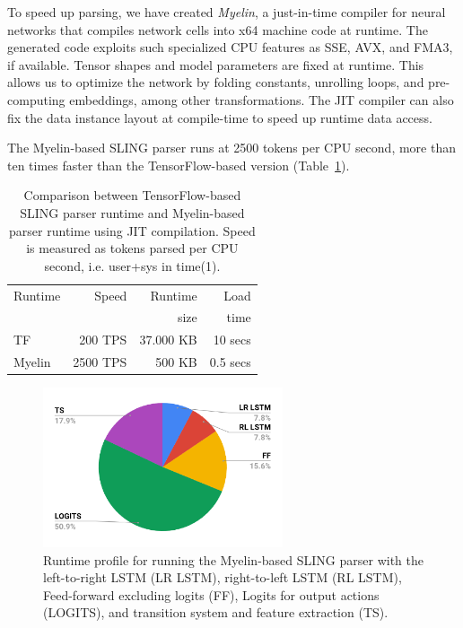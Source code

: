 \documentclass[11pt,a4paper]{article}
\begin{document}
To speed up parsing, we have created \emph{Myelin}, a
just-in-time compiler for neural networks that compiles network cells into
x64 machine code at runtime. The generated code exploits such
specialized CPU features as SSE, AVX, and FMA3, if available.
Tensor shapes and model parameters are fixed at runtime.
This allows us to optimize the network by folding constants, unrolling
loops, and pre-computing embeddings, among other transformations. The JIT compiler can also fix the data
instance layout at compile-time to speed up runtime data access.

The Myelin-based SLING parser runs at 2500 tokens per CPU second, more
than ten times faster than the TensorFlow-based version
(Table~\ref{tab:runtime}).

\begin{table}[!t]
\centering
\begin{tabular}{|l|r|r|r|}
\hline
Runtime    & Speed     & Runtime      & Load      \\
           &           & size         & time      \\
\hline
TF         &  200 TPS  & 37.000 KB    & 10 secs   \\
Myelin     & 2500 TPS  &    500 KB    & 0.5 secs  \\
\hline
\end{tabular}
\caption{Comparison between TensorFlow-based SLING parser runtime and 
Myelin-based parser runtime using JIT compilation.
Speed is measured as tokens parsed per CPU second, i.e. user+sys in time(1).}
\label{tab:runtime}
\end{table}

\begin{figure}[t]
  \centering
  \includegraphics[width = 200pt]{runtime.pdf}
  \caption{Runtime profile for running the Myelin-based SLING parser with the
  left-to-right LSTM (LR LSTM), right-to-left LSTM (RL LSTM), Feed-forward
  excluding logits (FF), Logits for output actions (LOGITS), and transition
  system and feature extraction (TS).}
  \label{fig:runtime}
\end{figure}
\end{document}
